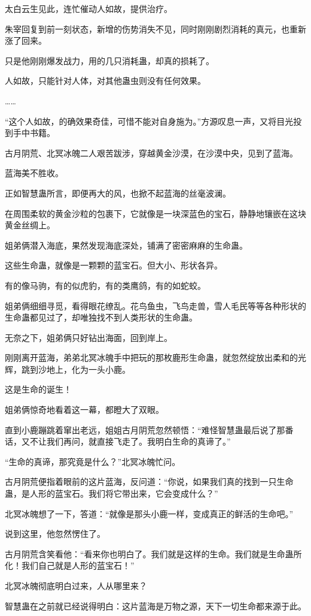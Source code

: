 \begin{this_body}
太白云生见此，连忙催动人如故，提供治疗。

朱宰回复到前一刻状态，新增的伤势消失不见，同时刚刚剧烈消耗的真元，也重新涨了回来。

只是他刚刚爆发战力，用的几只消耗蛊，却真的损耗了。

人如故，只能针对人体，对其他蛊虫则没有任何效果。

……

“这个人如故，的确效果奇佳，可惜不能对自身施为。”方源叹息一声，又将目光投到手中书籍。

古月阴荒、北冥冰魄二人艰苦跋涉，穿越黄金沙漠，在沙漠中央，见到了蓝海。

蓝海美不胜收。

正如智慧蛊所言，即便再大的风，也掀不起蓝海的丝毫波澜。

在周围柔软的黄金沙粒的包裹下，它就像是一块深蓝色的宝石，静静地镶嵌在这块黄金丝绸上。

姐弟俩潜入海底，果然发现海底深处，铺满了密密麻麻的生命蛊。

这些生命蛊，就像是一颗颗的蓝宝石。但大小、形状各异。

有的像马驹，有的似虎豹，有的类鹰鸽，有的如蛇蛟。

姐弟俩细细寻觅，看得眼花缭乱。花鸟鱼虫，飞鸟走兽，雪人毛民等等各种形状的生命蛊都见过了，却唯独找不到人类形状的生命蛊。

无奈之下，姐弟俩只好钻出海面，回到岸上。

刚刚离开蓝海，弟弟北冥冰魄手中把玩的那枚鹿形生命蛊，就忽然绽放出柔和的光辉，跳到沙地上，化为一头小鹿。

这是生命的诞生！

姐弟俩惊奇地看着这一幕，都瞪大了双眼。

直到小鹿蹦跳着窜出老远，姐姐古月阴荒忽然顿悟：“难怪智慧蛊最后说了那番话，又不让我们再问，就直接飞走了。我明白生命的真谛了。”

“生命的真谛，那究竟是什么？”北冥冰魄忙问。

古月阴荒便指着眼前的这片蓝海，反问道：“你说，如果我们真的找到一只生命蛊，是人形的蓝宝石。我们将它带出来，它会变成什么？”

北冥冰魄想了一下，答道：“就像是那头小鹿一样，变成真正的鲜活的生命吧。”

说到这里，他忽然愣住了。

古月阴荒含笑看他：“看来你也明白了。我们就是这样的生命。我们就是生命蛊所化！我们自己就是人形的蓝宝石！”

北冥冰魄彻底明白过来，人从哪里来？

智慧蛊在之前就已经说得明白：这片蓝海是万物之源，天下一切生命都来源于此。


\end{this_body}
